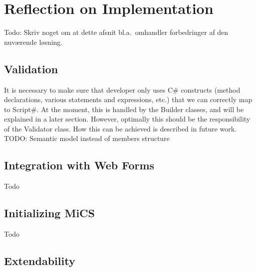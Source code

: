 \section{Reflection on Implementation} %
\label{sec:reflection_on_implementation}
Todo: Skriv noget om at dette afsnit bl.a.\ omhandler forbedringer af den nuværende løsning.

\subsection{Validation} %
\label{ssub:validation}
It is necessary to make sure that developer only uses C\# constructs (method declarations, various statements and expressions, etc.) that we can correctly map to Script\#. At the moment, this is handled by the Builder classes, and will be explained in a later section. However, optimally this should be the responsibility of the Validator class. How this can be achieved is described in future work.
TODO: Semantic model instead of members structure

\subsection{Integration with Web Forms} %
\label{ssub:integration_with_web_forms}
Todo

\subsection{Initializing MiCS} %
\label{ssub:collecting_source_code}
Todo

\subsection{Extendability} %
\label{sub:extendability}


